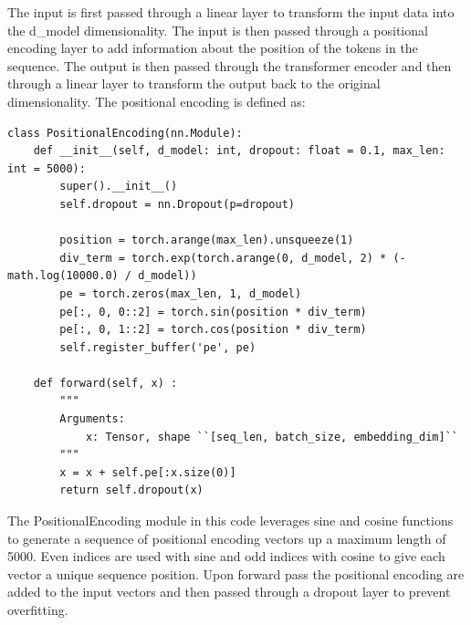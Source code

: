 \documentclass[11pt]{article}
\begin{document}
The input is first passed through a linear layer to transform the input data into the d\_model dimensionality. The input is then passed through a positional encoding layer to add information about the position of the tokens in the sequence. The output is then passed through the transformer encoder and then through a linear layer to transform the output back to the original dimensionality. The positional encoding is defined as:

\begin{lstlisting}[caption={Positional encoding implementation}, label=positional:encoding]
class PositionalEncoding(nn.Module):
    def __init__(self, d_model: int, dropout: float = 0.1, max_len: int = 5000):
        super().__init__()
        self.dropout = nn.Dropout(p=dropout)

        position = torch.arange(max_len).unsqueeze(1)
        div_term = torch.exp(torch.arange(0, d_model, 2) * (-math.log(10000.0) / d_model))
        pe = torch.zeros(max_len, 1, d_model)
        pe[:, 0, 0::2] = torch.sin(position * div_term)
        pe[:, 0, 1::2] = torch.cos(position * div_term)
        self.register_buffer('pe', pe)

    def forward(self, x) :
        """
        Arguments:
            x: Tensor, shape ``[seq_len, batch_size, embedding_dim]``
        """
        x = x + self.pe[:x.size(0)]
        return self.dropout(x)
\end{lstlisting}

The PositionalEncoding module in this code leverages sine and cosine functions to generate a sequence of positional encoding vectors up a maximum length of 5000. Even indices are used with sine and odd indices with cosine to give each vector a unique sequence position. Upon forward pass the positional encoding are added to the input vectors and then passed through a dropout layer to prevent overfitting.  
\end{document}
